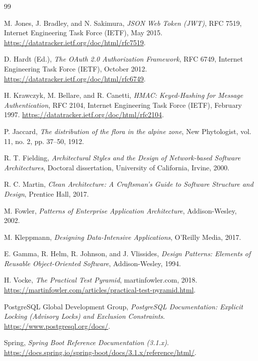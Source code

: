 \begin{thebibliography}{99}

M. Jones, J. Bradley, and N. Sakimura, \textit{JSON Web Token (JWT)}, RFC 7519, Internet Engineering Task Force (IETF), May 2015. \url{https://datatracker.ietf.org/doc/html/rfc7519}.

D. Hardt (Ed.), \textit{The OAuth 2.0 Authorization Framework}, RFC 6749, Internet Engineering Task Force (IETF), October 2012. \url{https://datatracker.ietf.org/doc/html/rfc6749}.

H. Krawczyk, M. Bellare, and R. Canetti, \textit{HMAC: Keyed-Hashing for Message Authentication}, RFC 2104, Internet Engineering Task Force (IETF), February 1997. \url{https://datatracker.ietf.org/doc/html/rfc2104}.

P. Jaccard, \textit{The distribution of the flora in the alpine zone}, New Phytologist, vol. 11, no. 2, pp. 37--50, 1912.

R. T. Fielding, \textit{Architectural Styles and the Design of Network-based Software Architectures}, Doctoral dissertation, University of California, Irvine, 2000.

R. C. Martin, \textit{Clean Architecture: A Craftsman's Guide to Software Structure and Design}, Prentice Hall, 2017.

M. Fowler, \textit{Patterns of Enterprise Application Architecture}, Addison-Wesley, 2002.

M. Kleppmann, \textit{Designing Data-Intensive Applications}, O'Reilly Media, 2017.

E. Gamma, R. Helm, R. Johnson, and J. Vlissides, \textit{Design Patterns: Elements of Reusable Object-Oriented Software}, Addison-Wesley, 1994.

H. Vocke, \textit{The Practical Test Pyramid}, martinfowler.com, 2018. \url{https://martinfowler.com/articles/practical-test-pyramid.html}.

PostgreSQL Global Development Group, \textit{PostgreSQL Documentation: Explicit Locking (Advisory Locks) and Exclusion Constraints}. \url{https://www.postgresql.org/docs/}.

Spring, \textit{Spring Boot Reference Documentation (3.1.x)}. \url{https://docs.spring.io/spring-boot/docs/3.1.x/reference/html/}.


\end{thebibliography}
